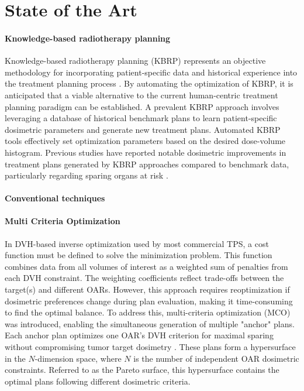 \section{State of the Art}
\paragraph{Knowledge-based radiotherapy planning}
Knowledge-based radiotherapy planning (KBRP) represents an objective methodology for incorporating patient-specific data and historical experience into the treatment planning process \cite{Nwankwo_2014}.
By automating the optimization of KBRP, it is anticipated that a viable alternative to the current human-centric treatment planning paradigm can be established.
A prevalent KBRP approach involves leveraging a database of historical benchmark plans to learn patient-specific dosimetric parameters and generate new treatment plans.
Automated KBRP tools effectively set optimization parameters based on the desired dose-volume histogram.
Previous studies have reported notable dosimetric improvements in treatment plans generated by KBRP approaches compared to benchmark data, particularly regarding sparing organs at risk \cite{Fogliata2014,Tol2015}.

\paragraph{Conventional techniques}

\paragraph{Multi Criteria Optimization}
In DVH-based inverse optimization used by most commercial TPS, a cost function must be defined to solve the minimization problem.
This function combines data from all volumes of interest as a weighted sum of penalties from each DVH constraint.
The weighting coefficients reflect trade-offs between the target(s) and different OARs.
However, this approach requires reoptimization if dosimetric preferences change during plan evaluation, making it time-consuming to find the optimal balance.
To address this, multi-criteria optimization (MCO) was introduced, enabling the simultaneous generation of multiple "anchor" plans.
Each anchor plan optimizes one OAR’s DVH criterion for maximal sparing without compromising tumor target dosimetry \cite{lahanas2003,thieke2007}.
These plans form a hypersurface in the $N$-dimension space, where $N$ is the number of independent OAR dosimetric constraints.
Referred to as the Pareto surface, this hypersurface contains the optimal plans following different dosimetric criteria.

